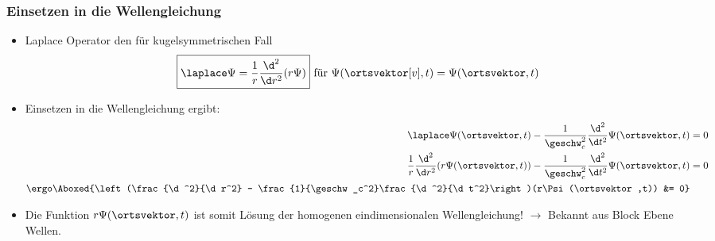 \begin{frame}
  \frametitle{Einsetzen in die Wellengleichung}
  \begin{itemize}[<+->]
  \item Laplace Operator den für kugelsymmetrischen Fall
    \begin{equation*}
      \boxed{\laplace \Psi= \frac{1}{r}\frac{\d^2}{\d r^2}(r\Psi)} \text{ für } \Psi(\ortsvektor[v],t) = \Psi(\ortsvektor,t)
    \end{equation*}
  \item Einsetzen in die Wellengleichung ergibt:
    \begin{align*}
      \laplace \Psi(\ortsvektor,t) - \frac{1}{\geschw_c^2}\frac{\d^2}{\d t^2}\Psi(\ortsvektor,t) &= 0\\
      \frac{1}{r}\frac{\d^2}{\d r^2}(r\Psi(\ortsvektor,t)) - \frac{1}{\geschw_c^2}\frac{\d^2}{\d t^2}\Psi(\ortsvektor,t) &= 0\\
      \ergo \Aboxed{\left(\frac{\d^2}{\d r^2} - \frac{1}{\geschw_c^2}\frac{\d^2}{\d t^2}\right)(r\Psi(\ortsvektor,t)) &= 0} 
    \end{align*}
    \item Die Funktion \alert{\(r\Psi(\ortsvektor,t)\)} ist somit Lösung der homogenen eindimensionalen Wellengleichung! \(\to\) Bekannt aus Block \alert{Ebene Wellen}.
  \end{itemize}
  \end{frame}

